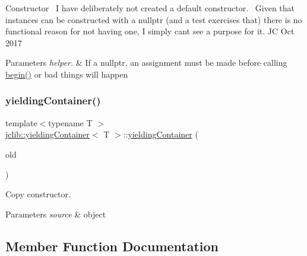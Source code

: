 Constructor~\newline
 I have deliberately not created a default constructor.~\newline
 Given that instances can be constructed with a nullptr (and a test exercises that) there is no functional reason for not having one, I simply can\textquotesingle{}t see a purpose for it. JC Oct 2017 
\begin{DoxyParams}{Parameters}
{\em helper.} & If a nullptr, an assignment must be made before calling \hyperlink{classjclib_1_1yieldingContainer_a9cdbb83859db191572b78264821c5d3b}{begin()} or bad things will happen \\
\hline
\end{DoxyParams}
\mbox{\label{classjclib_1_1yieldingContainer_a63e99537ac3eda23b731bcca7c4ec7a7}} 
\subsubsection{\texorpdfstring{yielding\+Container()}{yieldingContainer()}\hspace{0.1cm}{\footnotesize\ttfamily [2/2]}}
{\footnotesize\ttfamily template$<$typename T $>$ \\
\hyperlink{classjclib_1_1yieldingContainer}{jclib\+::yielding\+Container}$<$ T $>$\+::\hyperlink{classjclib_1_1yieldingContainer}{yielding\+Container} (\begin{DoxyParamCaption}\item[{const \hyperlink{classjclib_1_1yieldingContainer}{yielding\+Container}$<$ T $>$ \&}]{old }\end{DoxyParamCaption})\hspace{0.3cm}{\ttfamily [inline]}}

Copy constructor. 
\begin{DoxyParams}{Parameters}
{\em source} & object \\
\hline
\end{DoxyParams}


\subsection{Member Function Documentation}
\mbox{\label{classjclib_1_1yieldingContainer_a9cdbb83859db191572b78264821c5d3b}} 
